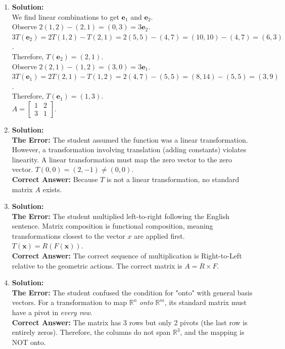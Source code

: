\documentclass[12pt]{article}
\begin{document}
\begin{enumerate}
    \item \textbf{Solution:}\\
    We find linear combinations to get $\mathbf{e}_1$ and $\mathbf{e}_2$. \\
    Observe $2(1, 2) - (2, 1) = (0, 3) = 3\mathbf{e}_2$. \\
    $3T(\mathbf{e}_2) = 2T(1, 2) - T(2, 1) = 2(5, 5) - (4, 7) = (10, 10) - (4, 7) = (6, 3)$. \\
    Therefore, $T(\mathbf{e}_2) = (2, 1)$. \\
    Observe $2(2, 1) - (1, 2) = (3, 0) = 3\mathbf{e}_1$. \\
    $3T(\mathbf{e}_1) = 2T(2, 1) - T(1, 2) = 2(4, 7) - (5, 5) = (8, 14) - (5, 5) = (3, 9)$. \\
    Therefore, $T(\mathbf{e}_1) = (1, 3)$. \\
    $A = \begin{bmatrix} 1 & 2 \\ 3 & 1 \end{bmatrix}$.

    \item \textbf{Solution:}\\
    \textbf{The Error:} The student assumed the function was a linear transformation. However, a transformation involving translation (adding constants) violates linearity. A linear transformation must map the zero vector to the zero vector. $T(0, 0) = (2, -1) \neq (0, 0)$. \\
    \textbf{Correct Answer:} Because $T$ is not a linear transformation, no standard matrix $A$ exists.

    \item \textbf{Solution:}\\
    \textbf{The Error:} The student multiplied left-to-right following the English sentence. Matrix composition is functional composition, meaning transformations closest to the vector $x$ are applied first. $T(\mathbf{x}) = R(F(\mathbf{x}))$. \\
    \textbf{Correct Answer:} The correct sequence of multiplication is Right-to-Left relative to the geometric actions. The correct matrix is $A = R \times F$.

    \item \textbf{Solution:}\\
    \textbf{The Error:} The student confused the condition for "onto" with general basis vectors. For a transformation to map $\mathbb{R}^n$ \textit{onto} $\mathbb{R}^m$, its standard matrix must have a pivot in \textit{every row}. \\
    \textbf{Correct Answer:} The matrix has 3 rows but only 2 pivots (the last row is entirely zeros). Therefore, the columns do not span $\mathbb{R}^3$, and the mapping is NOT onto.
\end{enumerate}
\end{document}
